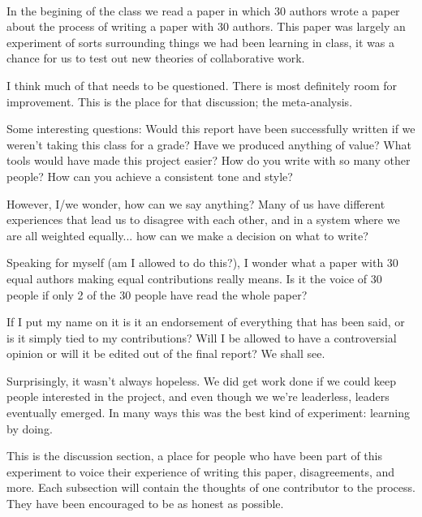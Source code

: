 \\
In the begining of the class we read a paper \cite{tomlinson2012} in which 30 authors wrote a paper about the process of writing a paper with 30 authors. This paper was largely an experiment of sorts surrounding things we had been learning in class, it was a chance for us to test out new theories of collaborative work.

I think much of that needs to be questioned. There is most definitely room for improvement. This is the place for that discussion; the meta-analysis.

Some interesting questions:
Would this report have been successfully written if we weren't taking this class for a grade?
Have we produced anything of value?
What tools would have made this project easier? 
How do you write with so many other people? 
How can you achieve a consistent tone and style? 

However, I/we wonder, how can we say anything? Many of us have different experiences that lead us to disagree with each other, and in a system where we are all weighted equally... how can we make a decision on what to write?

Speaking for myself (am I allowed to do this?), I wonder what a paper with 30 equal authors making equal contributions really means. Is it the voice of 30 people if only 2 of the 30 people have read the whole paper?

If I put my name on it is it an endorsement of everything that has been said, or is it simply tied to my contributions? Will I be allowed to have a controversial opinion or will it be edited out of the final report? We shall see.

Surprisingly, it wasn't always hopeless. We did get work done if we could keep people interested in the project, and even though we we're leaderless, leaders eventually emerged. In many ways this was the best kind of experiment: learning by doing.  

This is the discussion section, a place for people who have been part of this experiment to voice their experience of writing this paper, disagreements, and more. Each subsection will contain the thoughts of one contributor to the process. They have been encouraged to be as honest as possible.




